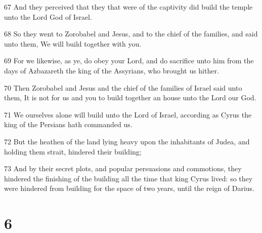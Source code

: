 \par 67 And they perceived that they that were of the captivity did build the temple unto the Lord God of Israel.
\par 68 So they went to Zorobabel and Jesus, and to the chief of the families, and said unto them, We will build together with you.
\par 69 For we likewise, as ye, do obey your Lord, and do sacrifice unto him from the days of Azbazareth the king of the Assyrians, who brought us hither.
\par 70 Then Zorobabel and Jesus and the chief of the families of Israel said unto them, It is not for us and you to build together an house unto the Lord our God.
\par 71 We ourselves alone will build unto the Lord of Israel, according as Cyrus the king of the Persians hath commanded us.
\par 72 But the heathen of the land lying heavy upon the inhabitants of Judea, and holding them strait, hindered their building;
\par 73 And by their secret plots, and popular persuasions and commotions, they hindered the finishing of the building all the time that king Cyrus lived: so they were hindered from building for the space of two years, until the reign of Darius.

\chapter{6}

